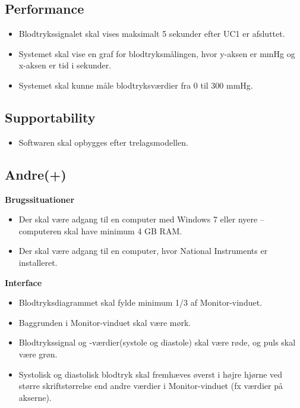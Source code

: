 \subsection{Performance}
\begin{itemize}
	\item Blodtrykssignalet skal vises maksimalt 5 sekunder efter UC1 er afsluttet.
	\item Systemet skal vise en graf for blodtryksmålingen, hvor y-aksen er mmHg og x-aksen er tid i sekunder.
	\item Systemet skal kunne måle blodtryksværdier fra 0 til 300 mmHg.
\end{itemize}

\subsection{Supportability}
\begin{itemize}
	\item Softwaren skal opbygges efter trelagsmodellen.
\end{itemize}

\subsection{Andre(+)}
\textbf{Brugssituationer}
\begin{itemize}
	\item Der skal være adgang til en computer med Windows 7 eller nyere – computeren skal have minimum 4 GB RAM.
	\item Der skal være adgang til en computer, hvor National Instruments er installeret.
\end{itemize}
\textbf{Interface}
\begin{itemize}
	\item Blodtryksdiagrammet skal fylde minimum 1/3 af Monitor-vinduet.
	\item Baggrunden i Monitor-vinduet skal være mørk.
	\item Blodtrykssignal og -værdier(systole og diastole) skal være røde, og puls skal være grøn.
	\item Systolisk og diastolisk blodtryk skal fremhæves øverst i højre hjørne ved større skriftstørrelse end andre værdier i Monitor-vinduet (fx værdier på akserne).
\end{itemize}













